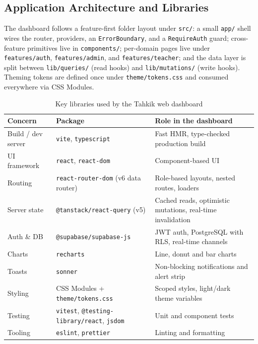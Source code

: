\subsection{Application Architecture and Libraries}

The dashboard follows a feature-first folder layout under \texttt{src/}: a small \texttt{app/} shell wires the router, providers, an \texttt{ErrorBoundary}, and a \texttt{RequireAuth} guard; cross-feature primitives live in \texttt{components/}; per-domain pages live under \texttt{features/auth}, \texttt{features/admin}, and \texttt{features/teacher}; and the data layer is split between \texttt{lib/queries/} (read hooks) and \texttt{lib/mutations/} (write hooks). Theming tokens are defined once under \texttt{theme/tokens.css} and consumed everywhere via CSS Modules.

\begin{table}[H]
  \centering
  \caption{Key libraries used by the Tahkik web dashboard}
  \label{tab:impl_dash_libs}
  \renewcommand{\arraystretch}{1.3}
  \begin{tabular}{lp{4.2cm}p{6cm}}
    \toprule
    \textbf{Concern} & \textbf{Package} & \textbf{Role in the dashboard} \\
    \midrule
    Build / dev server & \texttt{vite}, \texttt{typescript} & Fast HMR, type-checked production build \\
    UI framework       & \texttt{react}, \texttt{react-dom} & Component-based UI \\
    Routing            & \texttt{react-router-dom} (v6 data router) & Role-based layouts, nested routes, loaders \\
    Server state       & \texttt{@tanstack/react-query} (v5) & Cached reads, optimistic mutations, real-time invalidation \\
    Auth \& DB         & \texttt{@supabase/supabase-js} & JWT auth, PostgreSQL with RLS, real-time channels \\
    Charts             & \texttt{recharts} & Line, donut and bar charts \\
    Toasts             & \texttt{sonner} & Non-blocking notifications and alert strip \\
    Styling            & CSS Modules + \texttt{theme/tokens.css} & Scoped styles, light/dark theme variables \\
    Testing            & \texttt{vitest}, \texttt{@testing-library/react}, \texttt{jsdom} & Unit and component tests \\
    Tooling            & \texttt{eslint}, \texttt{prettier} & Linting and formatting \\
    \bottomrule
  \end{tabular}
\end{table}

